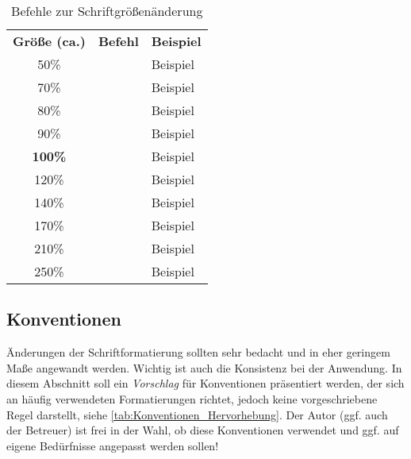 \begin{table}%
    \centering%
    \caption[Befehle zur Schriftgrößenänderung]{Befehle zur Schriftgrößenänderung \cite{fntguide} \label{tab:Befehle_Schriftgroessen}}%
    \begin{tabular}{cll}%
        \toprule %
        \textbf{Größe (ca.)} & \textbf{Befehl}         & \textbf{Beispiel}        \\ \cmidrule(r){1-1}\cmidrule(lr){2-2}\cmidrule(l){3-3} %
        50\%                 & \command{\tiny}         & {\tiny Beispiel}         \\
        70\%                 & \command{\scriptsize}   & {\scriptsize Beispiel}   \\
        80\%                 & \command{\footnotesize} & {\footnotesize Beispiel} \\
        90\%                 & \command{\small}        & {\small Beispiel}        \\
        \textbf{100\%}       & \command{\normalsize}   & {\normalsize Beispiel}   \\
        120\%                & \command{\large}        & {\large Beispiel}        \\
        140\%                & \command{\Large}        & {\Large Beispiel}        \\
        170\%                & \command{\LARGE}        & {\LARGE Beispiel}        \\
        210\%                & \command{\huge}         & {\huge Beispiel}         \\
        250\%                & \command{\Huge}         & {\Huge Beispiel}         \\
        \bottomrule %
    \end{tabular}%
\end{table}%



\subsection{Konventionen}
\label{sec:Konventionen}

Änderungen der Schriftformatierung sollten sehr bedacht und in eher geringem Maße angewandt werden. Wichtig ist auch die Konsistenz bei der Anwendung. In diesem Abschnitt soll ein \textit{Vorschlag} für Konventionen präsentiert werden, der sich an häufig verwendeten Formatierungen richtet, jedoch keine vorgeschriebene Regel darstellt, siehe \cref{tab:Konventionen_Hervorhebung}. Der Autor (ggf. auch der Betreuer) ist frei in der Wahl, ob diese Konventionen verwendet und ggf. auf eigene Bedürfnisse angepasst werden sollen!

